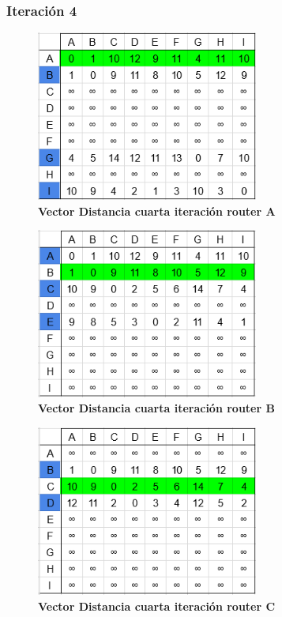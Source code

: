 \documentclass[12pt]{article}
\begin{document}
\newpage

\subsubsection{Iteración 4}

\begin{figure}[H] 
\centering 
\includegraphics[width=0.65\textwidth]{imagenes/2A4.png} \caption{\small \textbf{Vector Distancia cuarta iteración router A}}
\label{fig:diagrama_44} 
\end{figure}
\begin{figure}[H] 
\centering 
\includegraphics[width=0.65\textwidth]{imagenes/2B4.png} \caption{\small \textbf{Vector Distancia cuarta iteración router B}}
\label{fig:diagrama_45} 
\end{figure}
\begin{figure}[H] 
\centering 
\includegraphics[width=0.65\textwidth]{imagenes/2C4.png} \caption{\small \textbf{Vector Distancia cuarta iteración router C}}
\label{fig:diagrama_46} 
\end{figure}
\end{document}
